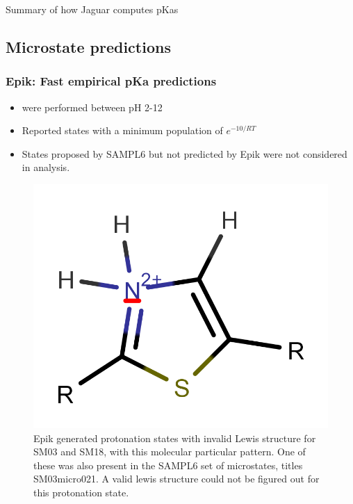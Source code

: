 \documentclass[9pt,lineno]{elife}
\begin{document}
Summary of how Jaguar computes pKas  

\subsection{Microstate predictions}

\subsubsection{Epik: Fast empirical pKa predictions}
\begin{itemize}
    \item were performed between pH 2-12
    \item Reported states with a minimum population of $e^{-10/RT}$
    \item States proposed by SAMPL6 but not predicted by Epik were not considered in analysis.

\end{itemize}
\begin{figure}
    \centering
    \includegraphics{invalid-lewis-SM03-SM18.png}
    \caption{Epik generated protonation states with invalid Lewis structure for SM03 and SM18, with this 
    molecular particular pattern. One of these was also present in the SAMPL6 set of microstates, titles SM03\textunderscore{}micro021. A valid lewis structure could not be figured out for this protonation state.}
    \label{fig:lewis-structure-SM03-SM18}
\end{figure}
\end{document}
